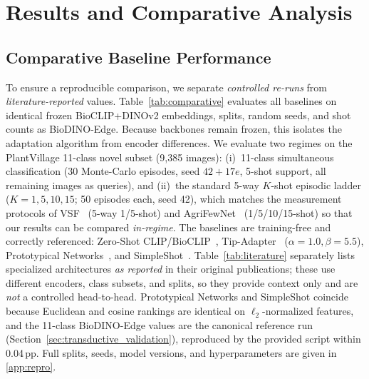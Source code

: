 \documentclass[preprint,12pt]{elsarticle}
\begin{document}
\section{Results and Comparative Analysis}
\label{sec:results}

\subsection{Comparative Baseline Performance}
\label{sec:comparative_results}
To ensure a reproducible comparison, we separate \emph{controlled re-runs} from \emph{literature-reported} values. Table~\ref{tab:comparative} evaluates all baselines on identical frozen BioCLIP+DINOv2 embeddings, splits, random seeds, and shot counts as BioDINO-Edge. Because backbones remain frozen, this isolates the adaptation algorithm from encoder differences. We evaluate two regimes on the PlantVillage 11-class novel subset (9{,}385 images): (i)~11-class simultaneous classification (30 Monte-Carlo episodes, seed $42+17e$, 5-shot support, all remaining images as queries), and (ii)~the standard 5-way $K$-shot episodic ladder ($K=1,5,10,15$; 50 episodes each, seed 42), which matches the measurement protocols of VSF~\cite{zhou2026vsf} (5-way 1/5-shot) and AgriFewNet~\cite{babu2025agrifewnet} (1/5/10/15-shot) so that our results can be compared \emph{in-regime}. The baselines are training-free and correctly referenced: Zero-Shot CLIP/BioCLIP~\cite{radford2021clip,stevens2024bioclip}, Tip-Adapter~\cite{zhang2022tip} ($\alpha{=}1.0,\beta{=}5.5$), Prototypical Networks~\cite{snell2017prototypical}, and SimpleShot~\cite{wang2019simpleshot}. Table~\ref{tab:literature} separately lists specialized architectures \emph{as reported} in their original publications; these use different encoders, class subsets, and splits, so they provide context only and are \emph{not} a controlled head-to-head. Prototypical Networks and SimpleShot coincide because Euclidean and cosine rankings are identical on $\ell_2$-normalized features, and the 11-class BioDINO-Edge values are the canonical reference run (Section~\ref{sec:transductive_validation}), reproduced by the provided script within 0.04\,pp. Full splits, seeds, model versions, and hyperparameters are given in \ref{app:repro}.
\end{document}
